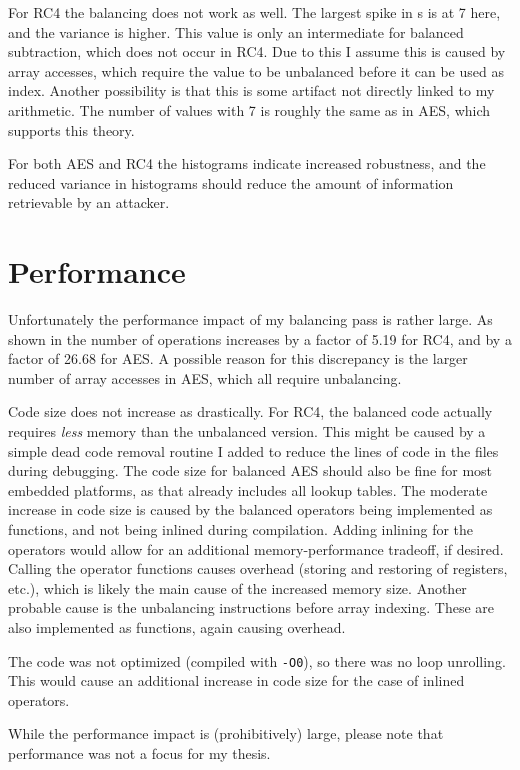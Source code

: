 For RC4 the balancing does not work as well.
The largest spike in \hammingw{}s is at 7 here, and the variance is higher.
This value is only an intermediate \hammingw{} for balanced subtraction, which does not occur in RC4.
Due to this I assume this is caused by array accesses, which require the value to be unbalanced before it can be used as index.
Another possibility is that this is some artifact not directly linked to my arithmetic.
The number of values with \hammingw{} 7 is roughly the same as in AES, which supports this theory.

For both AES and RC4 the histograms indicate increased robustness, and the reduced variance in histograms should reduce the amount of information retrievable by an attacker.

\section{Performance}
Unfortunately the performance impact of my balancing pass is rather large.
As shown in  the number of operations increases by a factor of 5.19 for RC4, and by a factor of 26.68 for AES.
A possible reason for this discrepancy is the larger number of array accesses in AES, which all require unbalancing.

Code size does not increase as drastically.
For RC4, the balanced code actually requires \emph{less} memory than the unbalanced version.
This might be caused by a simple dead code removal routine I added to reduce the lines of code in the \ir{} files during debugging.
The code size for balanced AES should also be fine for most embedded platforms, as that already includes all lookup tables.
The moderate increase in code size is caused by the balanced operators being implemented as functions, and not being inlined during compilation.
Adding inlining for the operators would allow for an additional memory-performance tradeoff, if desired.
Calling the operator functions causes overhead (storing and restoring of registers, etc.), which is likely the main cause of the increased memory size.
Another probable cause is the unbalancing instructions before array indexing.
These are also implemented as functions, again causing overhead.

The code was not optimized (compiled with \texttt{-O0}), so there was no loop unrolling.
This would cause an additional increase in code size for the case of inlined operators.

While the performance impact is (prohibitively) large, please note that performance was not a focus for my thesis.
